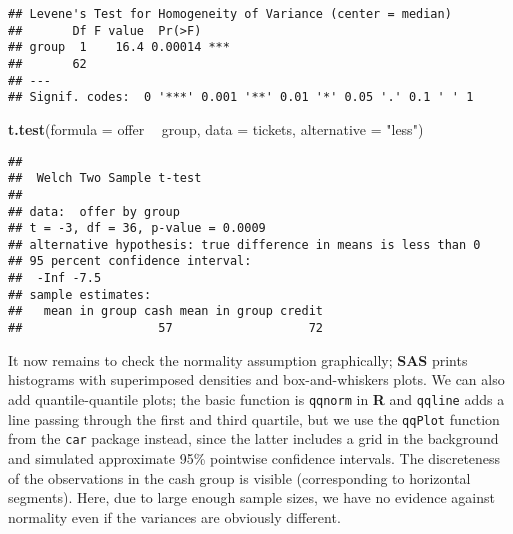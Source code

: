 \documentclass[
]{book}
\newenvironment{Shaded}{\begin{snugshade}}{\end{snugshade}}
\newcommand{\DataTypeTok}[1]{\textcolor[rgb]{0.13,0.29,0.53}{#1}}
\newcommand{\KeywordTok}[1]{\textcolor[rgb]{0.13,0.29,0.53}{\textbf{#1}}}
\newcommand{\NormalTok}[1]{#1}
\newcommand{\OperatorTok}[1]{\textcolor[rgb]{0.81,0.36,0.00}{\textbf{#1}}}
\newcommand{\StringTok}[1]{\textcolor[rgb]{0.31,0.60,0.02}{#1}}
\begin{document}
\begin{verbatim}
## Levene's Test for Homogeneity of Variance (center = median)
##       Df F value  Pr(>F)    
## group  1    16.4 0.00014 ***
##       62                    
## ---
## Signif. codes:  0 '***' 0.001 '**' 0.01 '*' 0.05 '.' 0.1 ' ' 1
\end{verbatim}

\begin{Shaded}
\begin{Highlighting}[]
\KeywordTok{t.test}\NormalTok{(}\DataTypeTok{formula =}\NormalTok{ offer }\OperatorTok{~}\StringTok{ }\NormalTok{group, }
       \DataTypeTok{data =}\NormalTok{ tickets, }
       \DataTypeTok{alternative =} \StringTok{"less"}\NormalTok{)}
\end{Highlighting}
\end{Shaded}

\begin{verbatim}
## 
##  Welch Two Sample t-test
## 
## data:  offer by group
## t = -3, df = 36, p-value = 0.0009
## alternative hypothesis: true difference in means is less than 0
## 95 percent confidence interval:
##  -Inf -7.5
## sample estimates:
##   mean in group cash mean in group credit 
##                   57                   72
\end{verbatim}

It now remains to check the normality assumption graphically; \textbf{SAS} prints histograms with superimposed densities and box-and-whiskers plots. We can also add quantile-quantile plots; the basic function is \texttt{qqnorm} in \textbf{R} and \texttt{qqline} adds a line passing through the first and third quartile, but we use the \texttt{qqPlot} function from the \texttt{car} package instead, since the latter includes a grid in the background and simulated approximate 95\% pointwise confidence intervals. The discreteness of the observations in the cash group is visible (corresponding to horizontal segments). Here, due to large enough sample sizes, we have no evidence against normality even if the variances are obviously different.
\end{document}
